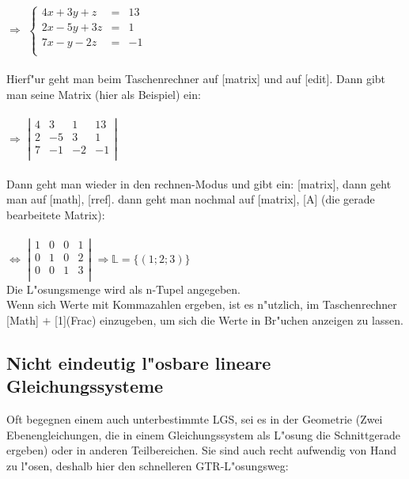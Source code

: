 \documentclass[../MAIN/main.tex]{subfiles}
\begin{document}
$\Rightarrow$ $\left\{ \begin{array}{rcl}
4x+3y+z&=&13\\
2x-5y+3z& =& 1\\
7x-y-2z&=&-1\\
\end{array}\right.$\\
\\
Hierf"ur geht man beim Taschenrechner auf [matrix] und auf [edit]. Dann gibt man seine Matrix (hier als Beispiel) ein:\\
\\
$\Rightarrow$ $\left\vert \begin{array}{rccl}
4&3&1&13\\
2&-5&3& 1 \\
7&-1&-2&-1\\
\end{array}\right\vert$\\
\\
Dann geht man wieder in den rechnen-Modus und gibt ein:  [matrix], dann geht man auf [math], [rref]. dann geht man nochmal auf [matrix], [A] (die gerade bearbeitete Matrix):\\
\\
$\Leftrightarrow$ $\left\vert \begin{array}{rccl}
1&0&0&1\\
0&1&0&2 \\
0&0&1&3\\
\end{array}\right\vert$ \qquad $\Rightarrow \mathbb{L}=\{(1;2;3) \}$ \\

Die L"osungsmenge wird als n-Tupel angegeben.\\
Wenn sich Werte mit Kommazahlen ergeben, ist es n"utzlich, im Taschenrechner [Math] $+$ [1](Frac) einzugeben, um sich die Werte in Br"uchen anzeigen zu lassen.\\

	\subsection{Nicht eindeutig l"osbare lineare Gleichungssysteme}

Oft begegnen einem auch unterbestimmte LGS, sei es in der Geometrie (Zwei Ebenengleichungen, die in einem Gleichungssystem als L"osung die Schnittgerade ergeben) oder in anderen Teilbereichen. Sie sind auch recht aufwendig von Hand zu l"osen, deshalb hier den schnelleren GTR-L"osungsweg:\\
\end{document}
